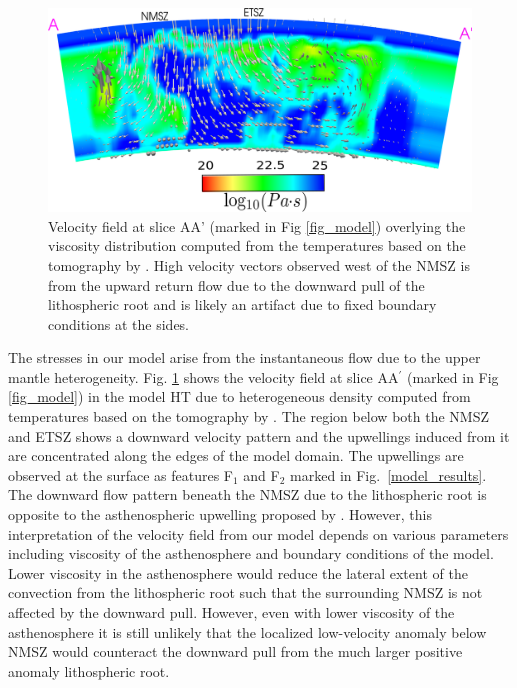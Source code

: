 \documentclass[draft,linenumbers]{agujournal2018}
\begin{document}
\begin{figure}[ht]
    \centering
    \includegraphics[width=0.9\linewidth]{figures/velocity_pattern.png}
    \caption{Velocity field at slice AA' (marked in Fig \ref{fig_model}) overlying the viscosity distribution computed from the temperatures based on the tomography by \citet{Biryol_2016}. High velocity vectors observed west of the NMSZ is from the upward return flow due to the downward pull of the lithospheric root and is likely an artifact due to fixed boundary conditions at the sides.}
    \label{velocity_pattern}
\end{figure}

    The stresses in our model arise from the instantaneous flow due to the upper mantle heterogeneity. Fig. \ref{velocity_pattern} shows the velocity field at slice AA$^{\prime}$ (marked in Fig \ref{fig_model}) in the model HT due to heterogeneous density computed from temperatures based on the tomography by \citet{Biryol_2016}. The region below both the NMSZ and ETSZ shows a downward velocity pattern and the upwellings induced from it are concentrated along the edges of the model domain. The upwellings are observed at the surface as features F$_1$ and F$_2$ marked in Fig.~\ref{model_results}. The downward flow pattern beneath the NMSZ due to the lithospheric root is opposite to the asthenospheric upwelling proposed by \citet{Biryol_2016}. However, this interpretation of the velocity field from our model depends on various parameters including viscosity of the asthenosphere and boundary conditions of the model. %
    Lower viscosity in the asthenosphere would reduce the lateral extent of the convection from the lithospheric root such that the surrounding NMSZ is not affected by the downward pull. However, even with lower viscosity of the asthenosphere it is still unlikely that the localized low-velocity anomaly below NMSZ would counteract the downward pull from the much larger positive anomaly lithospheric root. 
%    
\end{document}
